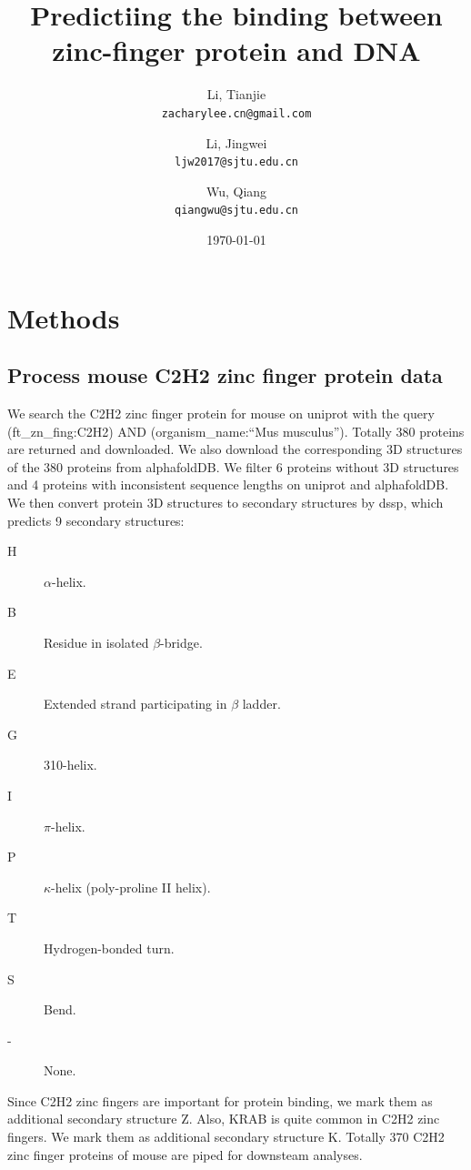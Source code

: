 \documentclass{article}
\title{Predictiing the binding between zinc-finger protein and DNA}
\author{
    Li, Tianjie\\
    \texttt{zacharylee.cn@gmail.com}
    \and
    Li, Jingwei\\
    \texttt{ljw2017@sjtu.edu.cn}
    \and
    Wu, Qiang\\
    \texttt{qiangwu@sjtu.edu.cn}
}
\date{\today}
\begin{document}
\maketitle

\section{Methods}

\subsection{Process mouse C2H2 zinc finger protein data}
We search the C2H2 zinc finger protein for mouse on uniprot with the query (ft\_zn\_fing:C2H2) AND (organism\_name:``Mus musculus''). Totally 380 proteins are returned and downloaded. We also download the corresponding 3D structures of the 380 proteins from alphafoldDB. We filter 6 proteins without 3D structures and 4 proteins with inconsistent sequence lengths on uniprot and alphafoldDB. We then convert protein 3D structures to secondary structures by dssp\cite{10.1093/nar/gkq1105}, which predicts 9 secondary structures:
\begin{description}
    \item[H] $\alpha$-helix.
    \item[B] Residue in isolated $\beta$-bridge.
    \item[E] Extended strand participating in $\beta$ ladder.
    \item[G] 310-helix.
    \item[I] $\pi$-helix.
    \item[P] $\kappa$-helix (poly-proline II helix).
    \item[T] Hydrogen-bonded turn.
    \item[S] Bend.
    \item[-] None.
\end{description}
Since C2H2 zinc fingers are important for protein binding, we mark them as additional secondary structure Z. Also, KRAB is quite common in C2H2 zinc fingers. We mark them as additional secondary structure K. Totally 370 C2H2 zinc finger proteins of mouse are piped for downsteam analyses.
\end{document}
